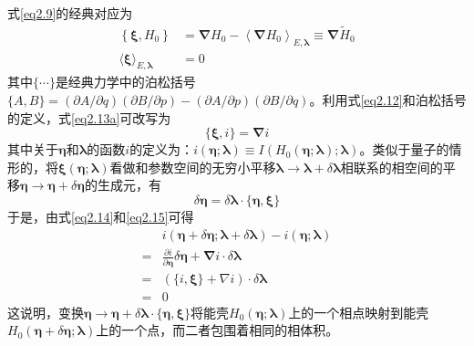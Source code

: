 式\eqref{eq2.9}的经典对应为\cite{Jarzynski1995}
\begin{subequations}
    \begin{align}
        \left\{\boldsymbol{\xi}, H_{0}\right\} &=\boldsymbol{\nabla} H_{0}-\left\langle\boldsymbol{\nabla} H_{0}\right\rangle_{E, \boldsymbol{\lambda}} \equiv \boldsymbol{\nabla} \tilde{H}_{0}    \label{eq2.13a}\\
        \langle\boldsymbol{\xi}\rangle_{E, \boldsymbol{\lambda}} &=0 \label{eq2.13b}
    \end{align}
    \label{eq2.13}
\end{subequations}
其中$\{ \cdots \}$是经典力学中的泊松括号$\{A, B\}=(\partial A / \partial q)(\partial B / \partial p)-(\partial A / \partial p)(\partial B / \partial q)$。利用式\eqref{eq2.12}和泊松括号的定义，式\eqref{eq2.13a}可改写为
\begin{equation}
    \{\boldsymbol{\xi}, i\}=\boldsymbol{\nabla} i
  \label{eq2.14}
\end{equation}
其中关于$\bm{\eta}$和$\bm{\lambda}$的函数$i$的定义为：$i (\bm{\eta}; \bm{\lambda}) \equiv I \left( H_0\left( \bm{\eta}; \bm{\lambda}\right) ; \bm{\lambda} \right)$。类似于量子的情形的，将$\boldsymbol{\xi} (\bm{\eta}; \bm{\lambda})$看做和参数空间的无穷小平移$\boldsymbol{\lambda} \to \boldsymbol{\lambda} + \delta \boldsymbol{\lambda}$相联系的相空间的平移$\bm{\eta} \to \bm{\eta} + \delta \bm{\eta}$的生成元，有\cite{H.1986}
\begin{equation}
    \delta \bm{\eta}=\delta \boldsymbol{\lambda} \cdot\{\bm{\eta}, \boldsymbol{\xi}\}
  \label{eq2.15}
\end{equation}
于是，由式\eqref{eq2.14}和\eqref{eq2.15}可得
\begin{equation}
    \begin{split}
        &i(\bm{\eta}+\delta \bm{\eta} ; \boldsymbol{\lambda}+\delta \boldsymbol{\lambda})-i(\bm{\eta} ; \boldsymbol{\lambda}) \\
        =&\frac{\partial i}{\partial \bm{\eta}} \delta \bm{\eta}+\boldsymbol{\nabla} i \cdot \delta \boldsymbol{\lambda} \\
        =&(\{i, \boldsymbol{\xi}\}+\nabla i) \cdot \delta \boldsymbol{\lambda}\\
        =&0
    \end{split}
    \label{eq2.16}
\end{equation}
这说明，变换$\bm{\eta} \to \bm{\eta} + \delta  \bm{\lambda} \cdot \{\bm{\eta}, \boldsymbol{\xi}\}$将能壳$H_{0}(\bm{\eta} ; \boldsymbol{\lambda})$上的一个相点映射到能壳$H_{0}(\bm{\eta} + \delta \bm{\eta} ; \boldsymbol{\lambda})$上的一个点，而二者包围着相同的相体积。

